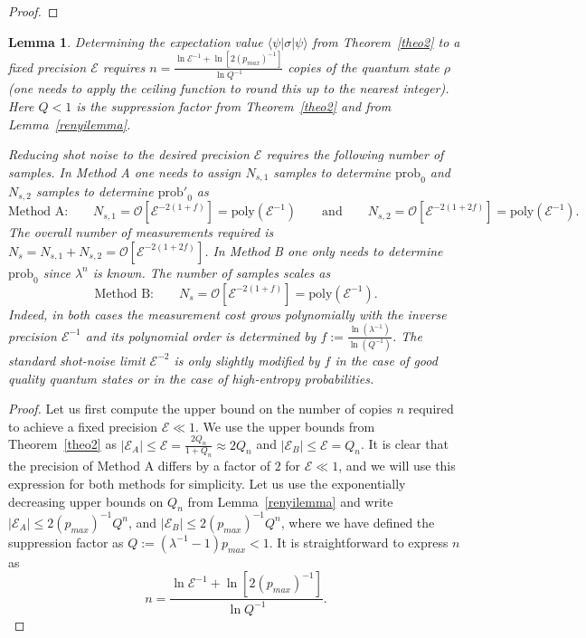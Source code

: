 \documentclass[aps,prx,showpacs,twocolumn,reprint]{revtex4-2}
\newtheorem{lemma}{Lemma}
\newcommand{\prob}{\mathrm{prob}_0}
\newcommand{\qn}{Q_n}
\begin{document}
{\begin{proof}
	
\end{proof}


\begin{lemma}\label{complexity_lemma}
	Determining the expectation value $ \langle\psi |\sigma | \psi \rangle$ from Theorem~\ref{theo2} to a
	fixed precision $\mathcal{E}$ requires $n=\frac{\ln \mathcal{E}^{-1} +  \ln{[2    (p_{max})^{{-}1}   ]}   }{\ln Q^{-1}}$ 
	copies of the quantum state $\rho$ (one needs to apply the ceiling function to round this up 
		to the nearest integer). Here $Q<1$ is the
	suppression factor from Theorem~\ref{theo2} and from Lemma~\ref{renyilemma}.
	
	Reducing shot noise to the desired precision $\mathcal{E}$ requires the following number of samples.
	In Method A one needs to assign $N_{s,1}$ samples to determine $\prob$
	and $N_{s,2}$ samples to determine $\mathrm{prob'}_0$ as
	\begin{equation}
	\text{Method A:} \quad \quad	N_{s,1} = \mathcal{O}[ \mathcal{E}^{-2 (1+f) } ] = \mathrm{poly}(\mathcal{E}^{-1})
	\quad \quad \text{and} \quad \quad
	N_{s,2} = \mathcal{O}[ \mathcal{E}^{-2 (1+2f) } ] = \mathrm{poly}(\mathcal{E}^{-1}).
	\end{equation}
	The overall number of measurements required is $N_{s} = N_{s,1}+N_{s,2} = \mathcal{O}[ \mathcal{E}^{-2 (1+2f) } ]$.
	In Method B one only needs to determine $\prob$ since $\lambda^n$ is known. The
	number of samples scales as
	\begin{equation}
	\text{Method B:} \quad \quad N_s  =\mathcal{O}[ \mathcal{E}^{-2 (1+f) } ] = \mathrm{poly}(\mathcal{E}^{-1}).
	\end{equation}
	Indeed, in both cases the measurement cost grows polynomially with the inverse precision $\mathcal{E}^{-1}$ and
	its polynomial order is determined by $f:= \frac{\ln(\lambda^{-1})}{\ln (Q^{-1})}$.
	The standard shot-noise limit $\mathcal{E}^{-2 }$ is only
	slightly modified by $f$ in the case of good quality quantum states or in the case of high-entropy
	probabilities.
\end{lemma}
\begin{proof}
	Let us first compute the upper bound on the number of copies $n$
	required to achieve a fixed precision $\mathcal{E}\ll1$. We use the upper bounds from Theorem~\ref{theo2}
	as $|\mathcal{E}_A| \leq \mathcal{E} = \frac{ 2 \qn}{1+\qn}\approx 2\qn$ and $|\mathcal{E}_B| \leq \mathcal{E} =  \qn$.
	It is clear that the precision of Method A differs by a factor of $2$ for $\mathcal{E}\ll1$, 
	and we will use this expression for both methods for simplicity.
	Let us use the exponentially decreasing upper
	bounds on $\qn$ from Lemma~\ref{renyilemma} and write $|\mathcal{E}_A| \leq 2  (p_{max})^{{-}1} Q^n $,
	and $|\mathcal{E}_B| \leq 2  (p_{max})^{{-}1} Q^n $,
	where we have defined the suppression factor as $Q := (\lambda^{-1}{-}1) p_{max}<1$.
	It is straightforward to express $n$ as
	\begin{equation}
	n = \frac{\ln \mathcal{E}^{-1} + \ln{[2  (p_{max})^{{-}1}   ]}}{\ln Q^{-1}}.
	\end{equation}


\end{proof}}
\end{document}
